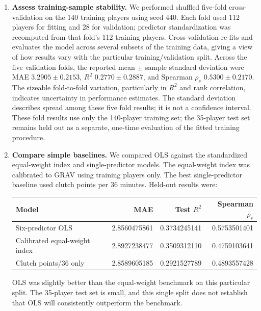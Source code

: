 \documentclass[11pt]{article}
\begin{document}
\begin{enumerate}
where $d_i$ is the difference between a player's predicted and official
rank. With ties, compute the Pearson correlation between the two sets
of assigned ranks. The held-out OLS Spearman correlation was
$\rho_s=0.5753501401$.
\item \textbf{Assess training-sample stability.} We performed shuffled
five-fold cross-validation on the 140 training players using seed 440.
Each fold used 112 players for fitting and 28 for validation; predictor
standardization was recomputed from that fold's 112 training players.
Cross-validation re-fits and evaluates the model across several subsets
of the training data, giving a view of how results vary with the
particular training/validation split. Across the five validation folds,
the reported mean $\pm$ sample standard deviation were MAE
$3.2905\pm0.2153$, $R^2$ $0.2770\pm0.2887$, and Spearman
$\rho_s$ $0.5300\pm0.2170$. The sizeable fold-to-fold variation,
particularly in $R^2$ and rank correlation, indicates uncertainty in
performance estimates. The standard deviation describes spread among
these five fold results; it is not a confidence interval. These fold
results use only the 140-player training set; the 35-player test set
remains held out as a separate, one-time evaluation of the fitted
training procedure.
\item \textbf{Compare simple baselines.} We compared OLS against the
standardized equal-weight index and single-predictor models. The
equal-weight index was calibrated to GRAV using training players only.
The best single-predictor baseline used clutch points per 36 minutes.
Held-out results were:
\begin{center}
\small
\begin{tabular}{@{}lrrr@{}}
\toprule
\textbf{Model} & \textbf{MAE} & \textbf{Test $R^2$} & \textbf{Spearman $\rho_s$}\\
\midrule
Six-predictor OLS & 2.8560475861 & 0.3734245141 & 0.5753501401\\
Calibrated equal-weight index & 2.8927238477 & 0.3509312110 & 0.4759103641\\
Clutch points/36 only & 2.8589605185 & 0.2921527789 & 0.4893557428\\
\bottomrule
\end{tabular}
\end{center}
OLS was slightly better than the equal-weight benchmark on this particular
split. The 35-player test set is small, and this single split does not
establish that OLS will consistently outperform the benchmark.
\end{enumerate}
\end{document}
